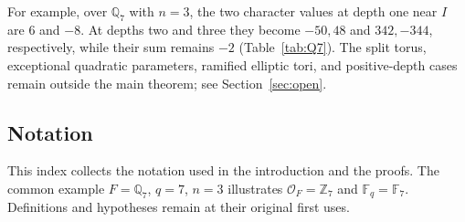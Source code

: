 \documentclass[12pt, letterpaper]{article}
\numberwithin{equation}{section}
\theoremstyle{definition}
\theoremstyle{remark}
\newcommand{\OO}{\mathcal{O}_F}
\newcommand{\kk}{\mathbb{F}_q}
\begin{document}
For example, over $\mathbb{Q}_7$ with $n=3$, the two character values at depth one near $I$ are $6$ and $-8$. At depths two and three they become $-50,48$ and $342,-344$, respectively, while their sum remains $-2$ (Table~\ref{tab:Q7}). The split torus, exceptional quadratic parameters, ramified elliptic tori, and positive-depth cases remain outside the main theorem; see Section~\ref{sec:open}.

\subsection{Notation}\label{sec:notation}

This index collects the notation used in the introduction and the proofs. The common example $F=\mathbb{Q}_7$, $q=7$, $n=3$ illustrates $\OO=\mathbb{Z}_7$ and $\kk=\mathbb{F}_7$. Definitions and hypotheses remain at their original first uses.
\end{document}
